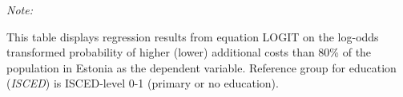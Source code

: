 \begin{table}[htbp!]
\begin{adjustbox}{width = 1\textwidth, max height = 0.95\textheight, center}
\begin{threeparttable}[b]
         \begin{tablenotes}\item \medskip \textit{Note:}
            \item This table displays regression results from equation LOGIT on the log-odds transformed probability of higher (lower) additional costs than 80\% of the population in Estonia as the dependent variable. Reference group for education (\textit{ISCED}) is ISCED-level 0-1 (primary or no education).
         \end{tablenotes}
      \end{threeparttable}
   \end{adjustbox}
\end{table}


